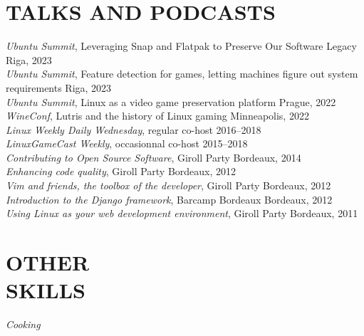 \documentclass[line,resmargin]{res}
\begin{document}
\begin{resume}
\section{TALKS AND PODCASTS}
    {\sl Ubuntu Summit}, Leveraging Snap and Flatpak to Preserve Our Software Legacy \hfill Riga, 2023 \\
    {\sl Ubuntu Summit}, Feature detection for games, letting machines figure out system requirements \hfill Riga, 2023 \\
    {\sl Ubuntu Summit}, Linux as a video game preservation platform \hfill Prague, 2022 \\
    {\sl WineConf}, Lutris and the history of Linux gaming \hfill Minneapolis, 2022  \\
    {\sl Linux Weekly Daily Wednesday}, regular co-host \hfill 2016--2018 \\
    {\sl LinuxGameCast Weekly}, occasionnal co-host \hfill 2015--2018 \\
    {\sl Contributing to Open Source Software},  Giroll Party \hfill Bordeaux, 2014 \\
    {\sl Enhancing code quality}, Giroll Party \hfill Bordeaux, 2012 \\
    {\sl Vim and friends, the toolbox of the developer}, Giroll Party \hfill Bordeaux, 2012 \\
    {\sl Introduction to the Django framework}, Barcamp Bordeaux \hfill Bordeaux, 2012 \\
    {\sl Using Linux as your web development environment}, Giroll Party \hfill Bordeaux, 2011

\section{OTHER \\ SKILLS}
    {\sl Cooking}

\end{resume}
\end{document}
